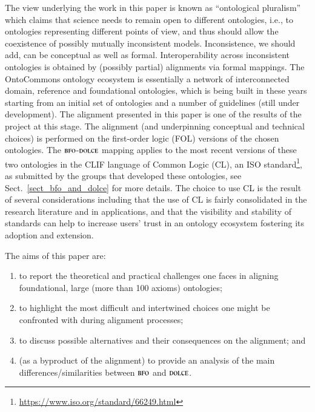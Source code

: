 \documentclass[ao]{iosart2x}
\newcommand{\dolce}{{\textsc{dolce}}}
\newcommand{\bfo}{{\textsc{bfo}}}
\newcommand{\emmo}{{\textsc{emmo}}}
\begin{document}
The view underlying the work in this paper is known as ``ontological pluralism'' which claims that science needs to remain open to different ontologies, i.e., to ontologies representing different points of view, and thus should allow the coexistence of possibly mutually inconsistent models. Inconsistence, we should add, can be conceptual as well as formal. Interoperability across inconsistent ontologies is obtained by (possibly partial) alignments via formal mappings. The OntoCommons ontology ecosystem is essentially a network of interconnected domain, reference and foundational ontologies, which is being built in these years starting from an initial set of ontologies and a number of guidelines (still under development). The alignment presented in this paper is one of the results of the project at this stage. 
The alignment (and underpinning conceptual and technical choices) is performed on the first-order logic (FOL) versions of the chosen ontologies. 
The $\bfo$-$\dolce$ mapping applies to the most recent versions of these two ontologies in the CLIF language of Common Logic (CL), an ISO standard\footnote{\url{https://www.iso.org/standard/66249.html}}, as submitted by the groups that developed these ontologies, see Sect.~\ref{sect_bfo_and_dolce} for more details. 
The choice to use CL is the result of several considerations including that the use of CL is fairly consolidated in the research literature and in applications, and that the visibility and stability of standards can help to increase users' trust in an ontology ecosystem fostering its adoption and extension.


\medskip 
The aims of this paper are:  
\begin{enumerate}[$(i)$]
\item to report the theoretical and practical challenges one faces in aligning foundational, large (more than 100 axioms) ontologies; 
\item to highlight the most difficult and intertwined choices one might be confronted with during alignment processes;
\item to discuss possible alternatives and their consequences on the alignment; and 
\item (as a byproduct of the alignment) to provide an analysis of the main differences/similarities between $\bfo$ and $\dolce$.
\end{enumerate}
\end{document}
